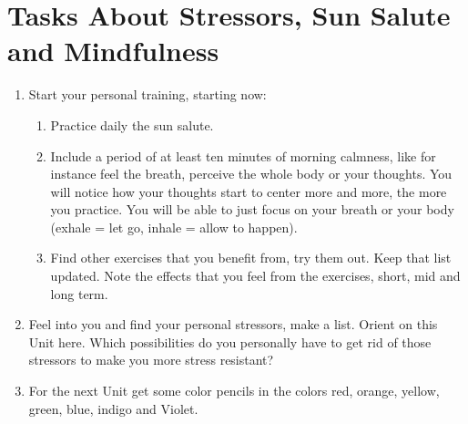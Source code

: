 \documentclass[../main.tex]{subfiles}
\begin{document}
  \section[Tasks]{Tasks About Stressors, Sun Salute and Mindfulness}
  \begin{enumerate}[label = \Alph*]
  \item Start your personal training, starting now:
    \begin{enumerate}
    \item Practice daily the sun salute.
    \item Include a period of at least ten minutes of morning calmness\label{Ex:MorningCalm}, like for instance feel the breath, perceive the whole body or your thoughts.
      You will notice how your thoughts start to center more and more, the more you practice.
      You will be able to just focus on your breath or your body (exhale = let go, inhale = allow to happen).
      \item Find other exercises that you benefit from, try them out. Keep that list updated. Note the effects that you feel from the exercises, short, mid and long term.
      \end{enumerate}
    \item Feel into you and find your personal stressors, make a list. Orient on this Unit here.
      Which possibilities do you personally have to get rid of those stressors to make you more stress resistant?
%
    \item For the next Unit %
      get some color pencils in the colors red, orange, yellow, green, blue, indigo and Violet.
      
\end{enumerate}
\end{document}
